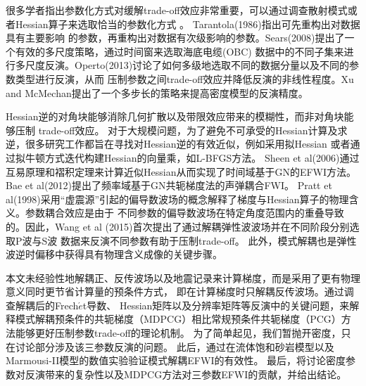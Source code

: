 很多学者指出参数化方式对缓解trade-off效应非常重要，可以通过调查散射模式或者Hessian算子来选取恰当的参数化方式
\cite[]{wu.aki:1985,tarantola:1986,plessix.cao:2011,gholami2013}。
Tarantola(1986)\cite{tarantola:1986}指出可先重构出对数据具有主要影响
的参数，再重构出对数据有次级影响的参数。Sears(2008)\cite{sears2008}提出了一个有效的多尺度策略，通过时间窗来选取海底电缆(OBC)
数据中的不同子集来进行多尺度反演。Operto(2013)\cite{operto2013guided}讨论了如何多级地选取不同的数据分量以及不同的参数类型进行反演，从而
压制参数之间trade-off效应并降低反演的非线性程度。Xu and McMechan\cite{xu.mcmechan:2014}提出了一个多步长的策略来提高密度模型的反演精度。

Hessian逆的对角块能够消除几何扩散以及带限效应带来的模糊性，而非对角块能够压制
trade-off效应\cite[]{pratt1998gauss,fichtner2011hessian,operto2013guided,innanen2014seismic,pan2015estimation}。
对于大规模问题，为了避免不可承受的Hessian计算及求逆，很多研究工作都旨在寻找对Hessian逆的有效近似，例如采用拟Hessian\cite[]{shin2001improved,choi.shin:2008}
或者通过拟牛顿方式迭代构建Hessian的向量乘，如L-BFGS方法\cite[]{nocedal2006numerical,brossier2009}。
Sheen et al(2006)\cite{sheen:2006}通过互易原理和褶积定理来计算近似Hessian从而实现了时间域基于GN的EFWI方法。
Bae et al(2012)\cite{bae:2012}提出了频率域基于GN共轭梯度法的声弹耦合FWI。
Pratt et al(1998)\cite{pratt1998gauss}采用“虚震源”引起的偏导数波场的概念解释了梯度与Hessian算子的物理含义。参数耦合效应是由于
不同参数的偏导数波场在特定角度范围内的重叠导致的。因此，Wang et al (2015)\cite{wang:2015}首次提出了通过解耦弹性波波场并在不同阶段分别选取P波与S波
数据来反演不同参数有助于压制trade-off。%
此外，模式解耦也是弹性波逆时偏移中获得具有物理含义成像的关键步骤\cite{yan:2008,wang2016scalar}。

本文未经验性地解耦正、反传波场以及地震记录\cite{ren.liu:2016}来计算梯度，而是采用了更有物理意义同时更节省计算量的预条件方式，
即在计算梯度时只解耦反传波场。通过调查解耦后的Frech{$\acute{e}$}t导数、
Hessian矩阵以及分辨率矩阵等反演中的关键问题，来解释模式解耦预条件的共轭梯度（MDPCG）相比常规预条件共轭梯度（PCG）方法能够更好压制参数trade-off的理论机制。
为了简单起见，我们暂抛开密度，只在讨论部分涉及该三参数反演的问题。
此后，通过在流体饱和砂岩模型以及Marmousi-II模型的数值实验验证模式解耦EFWI的有效性。
最后，将讨论密度参数对反演带来的复杂性以及MDPCG方法对三参数EFWI的贡献，并给出结论。

